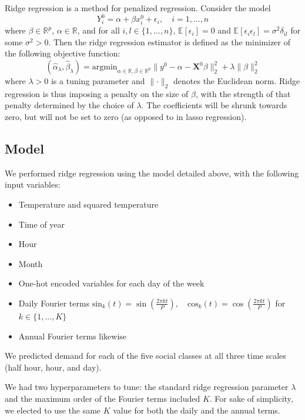 \documentclass[
]{article}
\providecommand{\tightlist}{%
  \setlength{\itemsep}{0pt}\setlength{\parskip}{0pt}}
\begin{document}
Ridge regression is a method for penalized regression. Consider the
model \[Y_i^0 = \alpha + \beta x_i^0 + \epsilon_i, \quad  i = 1,..., n\]
where \(\beta \in \mathbb{R}^p\), \(\alpha \in \mathbb{R}\), and for all
\(i, l \in \{1, ..., n\}\), \(\mathbb{E}[\epsilon_i] = 0\) and
\(\mathbb{E}[\epsilon_i \epsilon_l] = \sigma^2 \delta_{il}\) for some
\(\sigma^2 > 0\). Then the ridge regression estimator is defined as the
minimizer of the following objective function:
\[(\hat{\alpha}_\lambda, \hat{\beta}_\lambda) = \mathrm{argmin}_{\alpha \in \mathbb{R}, \beta \in \mathbb{R}^p} \lVert y^0 - \alpha - \boldsymbol{X}^0 \beta \rVert^2_2 + \lambda \lVert \beta \rVert^2_2\]
where \(\lambda > 0\) is a tuning parameter and
\(\lVert \cdot \rVert_2\) denotes the Euclidean norm. Ridge regression
is thus imposing a penalty on the size of \(\beta\), with the strength
of that penalty determined by the choice of \(\lambda\). The
coefficients will be shrunk towards zero, but will not be set to zero
(as opposed to in lasso regression).

\hypertarget{model}{%
\subsection{Model}\label{model}}

We performed ridge regression using the model detailed above, with the
following input variables:

\begin{itemize}
\tightlist
\item
  Temperature and squared temperature
\item
  Time of year
\item
  Hour
\item
  Month
\item
  One-hot encoded variables for each day of the week
\item
  Daily Fourier terms
  \(\text{sin}_k(t) = \sin\left(\frac{2\pi kt}{P}\right), \quad \text{cos}_k(t) = \cos\left(\frac{2\pi kt}{P}\right)\)
  for \(k \in \{1,...,K\}\)
\item
  Annual Fourier terms likewise
\end{itemize}

We predicted demand for each of the five social classes at all three
time scales (half hour, hour, and day).

We had two hyperparameters to tune: the standard ridge regression
parameter \(\lambda\) and the maximum order of the Fourier terms
included \(K\). For sake of simplicity, we elected to use the same \(K\)
value for both the daily and the annual terms.
\end{document}
